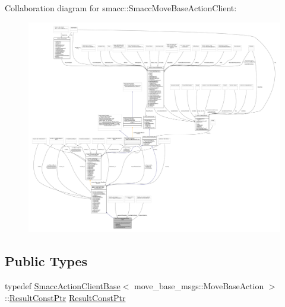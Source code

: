 Collaboration diagram for smacc\+:\+:Smacc\+Move\+Base\+Action\+Client\+:
\nopagebreak
\begin{figure}[H]
\begin{center}
\leavevmode
\includegraphics[width=350pt]{classsmacc_1_1SmaccMoveBaseActionClient__coll__graph}
\end{center}
\end{figure}
\subsection*{Public Types}
\begin{DoxyCompactItemize}
\item 
typedef \hyperlink{classsmacc_1_1SmaccActionClientBase}{Smacc\+Action\+Client\+Base}$<$ move\+\_\+base\+\_\+msgs\+::\+Move\+Base\+Action $>$\+::\hyperlink{classsmacc_1_1SmaccMoveBaseActionClient_a5a725caf88fe59bbf5300c1a33e193fc}{Result\+Const\+Ptr} \hyperlink{classsmacc_1_1SmaccMoveBaseActionClient_a5a725caf88fe59bbf5300c1a33e193fc}{Result\+Const\+Ptr}
\end{DoxyCompactItemize}
